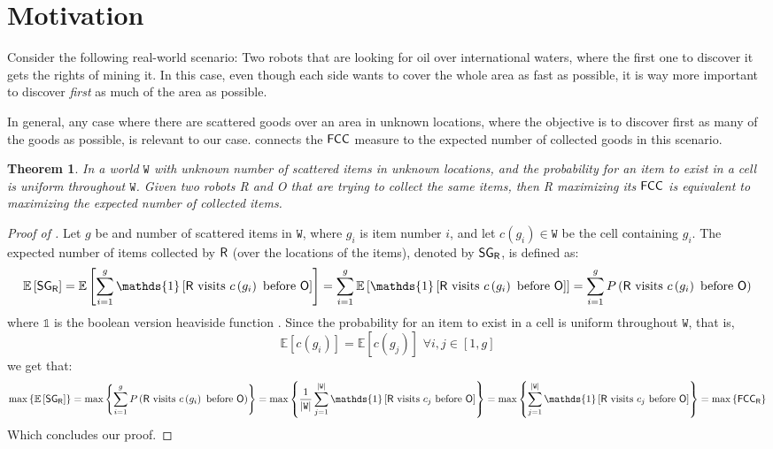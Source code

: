 \documentclass[letterpaper, 10 pt, conference]{ieeeconf}  %
\newtheorem{theorem}{Theorem}
\theoremstyle{definition}
\newcommand{\rob}{{{\sf R}}\xspace}
\newcommand{\opp}{{{\sf O}}\xspace}
\newcommand{\w}{{{\texttt W}}\xspace}
\newcommand{\fcc}{{{\sf{FCC}}}\xspace}
\newcommand{\sg}{{\sf{SG}_{\rob}}}
\DeclarePairedDelimiter\abs{\lvert}{\rvert}%
\begin{document}
\section{Motivation}
Consider the following real-world scenario:
Two robots that are looking for oil over international waters, where the first one to discover it gets the rights of mining it. In this case, even though each side wants to cover the whole area as fast as possible, it is way more important to discover {\em first} as much of the area as possible.

In general, any case where there are scattered goods over an area in unknown locations, where the objective is to discover first as many of the goods as possible, is relevant to our case.  connects the $\fcc$ measure to the expected number of collected goods in this scenario.%

\begin{theorem}\label{theorems: motivation}
In a world $\w$ with unknown number of scattered items in unknown locations, and the probability for an item to exist in a cell is uniform throughout $\w$. Given two robots \rob and \opp that are trying to collect the same items, then %
\rob maximizing its $\fcc$ is equivalent to maximizing the expected number of collected items. %
\end{theorem}
\begin{proof}[Proof of ]
Let $g$ be and number of scattered items in $\w$, where $g_i$ is item number $i$, and let $c(g_i)\in\w$ be the cell containing $g_i$.
The expected number of items collected by $\rob$ (over the locations of the items), denoted by $\sg$, is defined as:
\begin{dmath*}[compact] 
    \mathbb{E}\left[\sg\right]=\mathbb{E}\left[\sum_{i=1}^{g}{\mathds{1}\left[\rob\text{ visits } c\left(g_i\right)\text{ before }\opp \right]}\right]
    = \sum_{i=1}^{g}{\mathbb{E}\left[\mathds{1}\left[\rob\text{ visits } c\left(g_i\right)\text{ before }\opp\right]\right]} = \sum_{i=1}^{g}{P\left(\rob\text{ visits } c\left(g_i\right)\text{ before }\opp\right)}
\end{dmath*}
where $\mathds{1}$ is the boolean version heaviside function \cite{weisstein2002heaviside}.
Since the probability for an item to exist in a cell is uniform throughout $\w$, that is, \[\mathbb{E}\left[c\left(g_i\right)\right]=\mathbb{E}\left[c\left(g_j\right)\right] \,\,\forall i,j\in\left[1,g\right]\] we get that:
\begin{dmath*}[compact]
\max\left\{\mathbb{E}\left[\sg\right]\right\}=\max\left\{\sum_{i=1}^{g}{P\left(\rob\text{ visits } c\left(g_i\right)\text{ before }\opp \right)}\right\}
=\max\left\{\frac{1}{\abs*{\w}}\sum_{j=1}^{\abs*{\w}}{\mathds{1}\left[\rob \text{ visits } c_j \text{ before } \opp\right]}\right\}=\max\left\{\sum_{j=1}^{\abs*{\w}}{\mathds{1}\left[\rob \text{ visits } c_j \text{ before } \opp\right]}\right\}=\max\left\{\fcc_{\rob}\right\}
\end{dmath*}
Which concludes our proof.
\end{proof}
\end{document}
